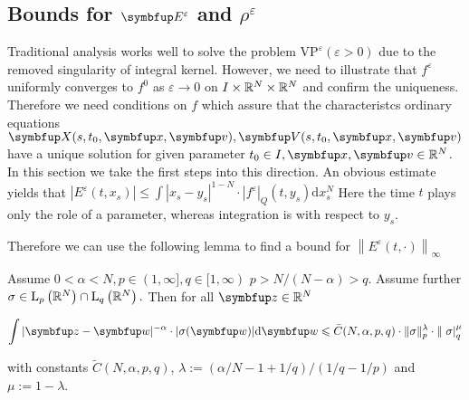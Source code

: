 \begin{lemma}



\section{Bounds for \texorpdfstring{$\vE^\varepsilon$}{Lg} and \texorpdfstring{$\rho^\varepsilon$}{Lg} }
Traditional analysis works well to solve the problem $\text{VP}^\varepsilon (\varepsilon >0)$ due to the removed singularity of integral kernel. However, we need to illustrate that $f^\varepsilon$ uniformly converges to $f^0$ as $\varepsilon\rightarrow 0 $ on $I\times {\mathbb{R}}^N \times {\mathbb{R}}^N $ and confirm the uniqueness. Therefore we need conditions on $f$ which assure that the characteristcs ordinary equations $\vect{X}(s,t_0, \vx,\vv),\vect{V}(s,t_0, \vx,\vv)$ have a unique solution for given parameter $t_0 \in I, \vx, \vv \in \bbR^N$. In this section we take the first steps into this direction. An obvious estimate yields that $\left|E^{\varepsilon}\left(t, x_{s}\right)\right| \leqslant \int\left|x_{s}-y_{s}\right|^{1-N} \cdot\left|f^{\varepsilon}\right|_{Q}\left(t, y_{s}\right) \mathrm{d} x_{s}^{N}$
Here the time $t$ plays only the role of a parameter, whereas integration is with respect to $y_{s} .$ 

Therefore we can use the following lemma to find a bound for $\left\|E^{\varepsilon}(t, \cdot)\right\|_{\infty}$
\begin{lemma}

    Assume $0<\alpha<N, p \in( 1, \infty], q \in[1, \infty)$ $p>N /(N-\alpha)>q .$ Assume further $\sigma \in \mathrm{L}_{p}\left({\mathbb{R}}^{N}\right) \cap \mathrm{L}_{q}\left({\mathbb{R}}^{N}\right) .$ Then for all $\vect{z} \in \bbR^{N}$

    \begin{equation}
        \label{eq:rho-E-bound}
        \int|\vect{z}-\vect{w}|^{-\alpha} \cdot|\sigma(\vect{w})| \mathrm{d} \vect{w} \leqslant \bar{C}(N, \alpha, p, q) \cdot\|\sigma\|_{p}^{\lambda} \cdot \|\left.\sigma\right|_{q} ^{\mu}
    \end{equation}
    
with constants $\tilde{C}(N, \alpha, p, q)$,   $\lambda:=(\alpha / N-1+1 / q) /(1 / q-1 / p)$ and $\mu:=1-\lambda $. 


\end{lemma}
\end{lemma}
